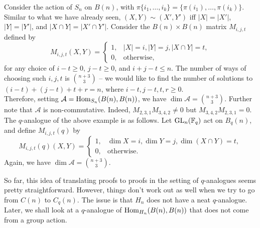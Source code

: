 	 \begin{fex}
	 	\label{ex:non-comm-alg}
	 	Consider the action of $S_n$ on $B(n)$, with $\pi \{i_1,\ldots,i_k\} = \{\pi(i_1),\ldots,\pi(i_k)\}$. Similar to what we have already seen, $(X,Y) \sim (X',Y')$ iff $|X| = |X'|$, $|Y| = |Y'|$, and $|X \cap Y| = |X' \cap Y'|$. Consider the $B(n) \times B(n)$ matrix $M_{i,j,t}$ defined by
	 	\[
	 	M_{i,j,t}(X,Y) =
	 	\begin{cases}
	 		1, & |X|=i, |Y|=j, |X \cap Y| = t, \\ 0, & \text{otherwise,}
	 	\end{cases}
	 	\]
	 	for any choice of $i-t\ge 0$, $j-t\ge 0$, and $i+j-t \le n$. The number of ways of choosing such $i,j,t$ is $\binom{n+3}{3}$ -- we would like to find the number of solutions to $(i-t) + (j-t) + t + r = n$, where $i-t,j-t,t,r \ge 0$.\\
	 	Therefore, setting $\mathcal{A} = \operatorname{Hom}_{S_n}(B(n),B(n))$, we have $\dim \mathcal{A} = \binom{n+3}{3}$. Further note that $\mathcal{A}$ is non-commutative. Indeed, $M_{2,3,1} M_{3,4,2} \ne 0$ but $M_{3,4,2} M_{2,3,1} = 0$.\\

	 	The $q$-analogue of the above example is as follows. Let $\operatorname{GL}_n(\mathbb{F}_q)$ act on $B_q(n)$, and define $M_{i,j,t}(q)$ by
	 	\[ M_{i,j,t}(q)(X,Y) = \begin{cases} 1, & \dim X = i, \dim Y = j, \dim (X \cap Y) = t, \\ 0, & \text{otherwise.} \end{cases} \]
	 	Again, we have $\dim \mathcal{A} = \binom{n+3}{3}$.
	 \end{fex}

	So far, this idea of translating proofs to proofs in the setting of $q$-analogues seems pretty straightforward. However, things don't work out as well when we try to go from $C(n)$ to $C_q(n)$. The issue is that $H_n$ does not have a neat $q$-analogue. Later, we shall look at a $q$-analogue of $\operatorname{Hom}_{H_n}(B(n),B(n))$ that does not come from a group action.

